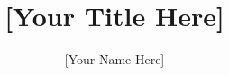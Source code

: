 \documentclass[MS, lite]{Thesis}
\author{[Your Name Here]}
\title{[Your Title Here]}
\begin{document}
\maketitle



\dedication{If you want to dedicate your thesis to anyone do so here}

\tableofcontents %
\listoftables	%
\listoffigures	%







\begin{appendix}



\end{appendix}

\cleardoublepage
\normalbaselines %
\printbibliography

% 
\end{document}
